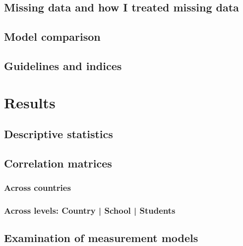 \documentclass[a4paper,11pt,UKenglish,twoside,openright]{report}\usepackage[]{graphicx}\usepackage[]{color}
\begin{document}
\section{Missing data and how I treated missing data}

\section{Model comparison}

\section{Guidelines and indices}



\chapter{Results}
\label{chp:4}



\section{Descriptive statistics}

\section{Correlation matrices}

\subsection{Across countries}

\subsection{Across levels: Country | School | Students}

\section{Examination of measurement models}
\end{document}
